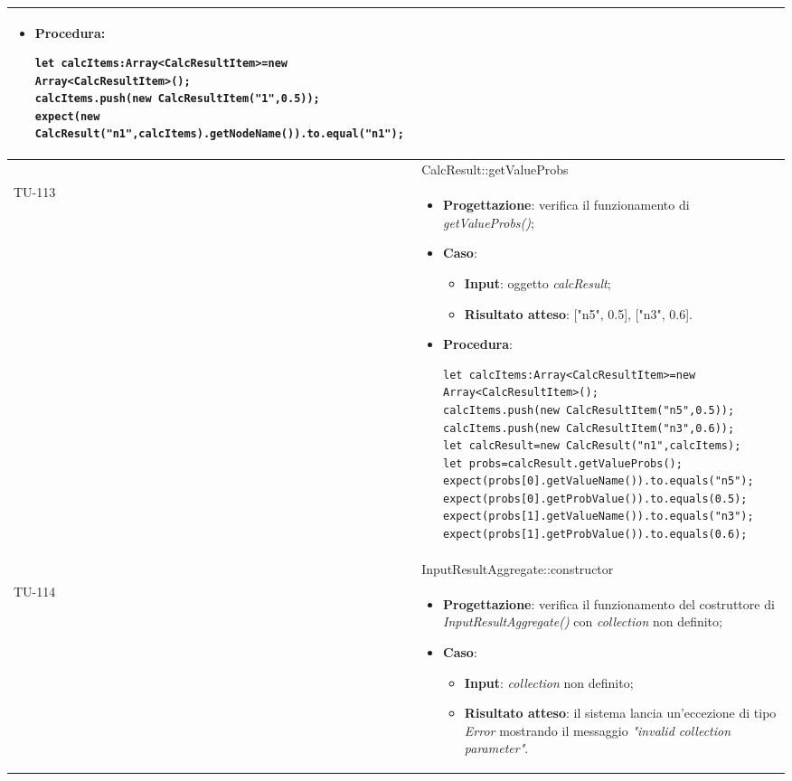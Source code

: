 \begin{longtable}{|C{1.5cm}|C{14.5cm}|}
\begin{itemize}
	\item \textbf{Procedura}:
	\begin{lstlisting}
let calcItems:Array<CalcResultItem>=new Array<CalcResultItem>();
calcItems.push(new CalcResultItem("1",0.5));
expect(new CalcResult("n1",calcItems).getNodeName()).to.equal("n1");
	\end{lstlisting}
\end{itemize}\\
\hline
{} & CalcResult::getValueProbs
\\ \hline
{TU-113} &
\begin{itemize}
	\item \textbf{Progettazione}: verifica il funzionamento di \emph{getValueProbs()};
	\item \textbf{Caso}: 
	\begin{itemize}
		\item \textbf{Input}: oggetto \emph{calcResult};
		\item \textbf{Risultato atteso}: ["n5", 0.5], ["n3", 0.6].
	\end{itemize}
	\item \textbf{Procedura}:
	\begin{lstlisting}
let calcItems:Array<CalcResultItem>=new Array<CalcResultItem>();
calcItems.push(new CalcResultItem("n5",0.5));
calcItems.push(new CalcResultItem("n3",0.6));
let calcResult=new CalcResult("n1",calcItems);
let probs=calcResult.getValueProbs();
expect(probs[0].getValueName()).to.equals("n5");
expect(probs[0].getProbValue()).to.equals(0.5);
expect(probs[1].getValueName()).to.equals("n3");
expect(probs[1].getProbValue()).to.equals(0.6);
	\end{lstlisting}
\end{itemize}\\
\hline
{} & InputResultAggregate::constructor
\\ \hline
{TU-114} &
\begin{itemize}
	\item \textbf{Progettazione}: verifica il funzionamento del costruttore di \emph{InputResultAggregate()} con \emph{collection} non definito;
	\item \textbf{Caso}: 
	\begin{itemize}
		\item \textbf{Input}: \emph{collection} non definito;
		\item \textbf{Risultato atteso}: il sistema lancia un'eccezione di tipo \emph{Error} mostrando il messaggio \emph{"invalid collection parameter"}.

\end{itemize}
\end{itemize}
\end{longtable}
